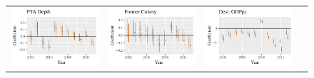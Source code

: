 \documentclass{article}
\begin{document}
\begin{figure}
\begin{tabular}{*{4}{@{}c}@{}}
\includegraphics[scale=.6]{draft_figures/rl_plots/PTADepth.pdf}    & 
\includegraphics[scale=.6]{draft_figures/rl_plots/FormerColony.pdf}    &
\includegraphics[scale=.6]{draft_figures/rl_plots/DestGDPpc.pdf}   & 

\end{tabular}
\end{figure}
\end{document}
